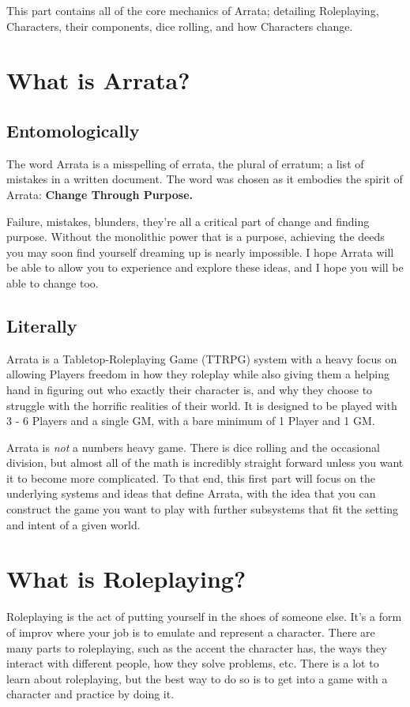 \documentclass[../main.tex]{subfiles}
\begin{document}
    This part contains all of the core mechanics of Arrata; detailing Roleplaying, Characters, their components, dice rolling, and how Characters change.

    \section{What is Arrata?}

    \subsection{Entomologically}
    The word Arrata is a misspelling of errata, the plural of erratum; a list of mistakes in a written document. The word was chosen as it embodies the spirit of Arrata: \textbf{Change Through Purpose.}

    Failure, mistakes, blunders, they're all a critical part of change and finding purpose. Without the monolithic power that is a purpose, achieving the deeds you may soon find yourself dreaming up is nearly impossible. I hope Arrata will be able to allow you to experience and explore these ideas, and I hope you will be able to change too.
    
    \subsection{Literally}
    Arrata is a Tabletop-Roleplaying Game (TTRPG) system with a heavy focus on allowing Players freedom in how they roleplay while also giving them a helping hand in figuring out who exactly their character is, and why they choose to struggle with the horrific realities of their world. It is designed to be played with 3 - 6 Players and a single GM, with a bare minimum of 1 Player and 1 GM.

    Arrata is {\em not} a numbers heavy game. There is dice rolling and the occasional division, but almost all of the math is incredibly straight forward unless you want it to become more complicated. To that end, this first part will focus on the underlying systems and ideas that define Arrata, with the idea that you can construct the game you want to play with further subsystems that fit the setting and intent of a given world.
    

    \section{What is Roleplaying?}

    Roleplaying is the act of putting yourself in the shoes of someone else. It's a form of improv where your job is to emulate and represent a character. There are many parts to roleplaying, such as the accent the character has, the ways they interact with different people, how they solve problems, etc. There is a lot to learn about roleplaying, but the best way to do so is to get into a game with a character and practice by doing it.
\end{document}
